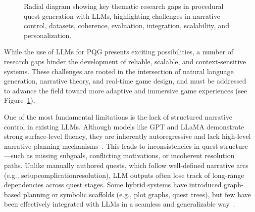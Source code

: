 \begin{figure}[t]
  \caption{Radial diagram showing key thematic research gaps in procedural quest generation with LLMs, highlighting challenges in narrative control, datasets, coherence, evaluation, integration, scalability, and personalization.}
  \label{fig:research-gaps}
\end{figure}

While the use of LLMs for PQG presents exciting possibilities, a number of research
gaps hinder the development of reliable, scalable, and context-sensitive systems. These
challenges are rooted in the intersection of natural language generation, narrative theory,
and real-time game design, and must be addressed to advance the field toward more
adaptive and immersive game experiences (see Figure~\ref{fig:research-gaps}).

One of the most fundamental limitations is the lack of structured narrative control in
existing LLMs. Although models like GPT and LLaMA demonstrate strong surface-level
fluency, they are inherently autoregressive and lack high-level narrative planning mechanisms~\cite{bommasani2021opportunities}.
This leads to inconsistencies in quest structure—such as missing subgoals,
conflicting motivations, or incoherent resolution paths. Unlike manually authored quests,
which follow well-defined narrative arcs (e.g., setup\textrightarrow complication\textrightarrow resolution), LLM outputs
often lose track of long-range dependencies across quest stages. Some hybrid systems
have introduced graph-based planning or symbolic scaffolds (e.g., plot graphs, quest
trees), but few have been effectively integrated with LLMs in a seamless and generalizable
way~\cite{ammanabrolu2019toward,ashby2023personalized}.

